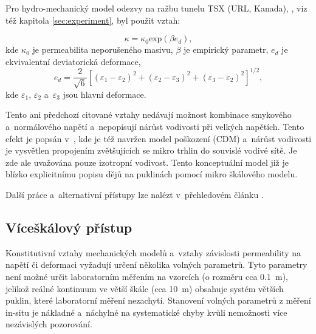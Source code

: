 \documentclass{article}
\begin{document}
Pro hydro-mechanický model odezvy na ražbu tunelu TSX (URL, Kanada), \cite{Rutqvist2009}, viz též kapitola \ref{sec:experiment}, byl použit vztah:

$$
	\kappa = \kappa_0 \mbox{exp}(\beta e_d),
$$
kde $\kappa_0$ je permeabilita neporušeného masivu, $\beta$ je empirický parametr, $e_d$ je ekvivalentní
deviatorická deformace,
$$
	e_d = \frac{2}{\sqrt{6}}[(\varepsilon_1 - \varepsilon_2)^2 + (\varepsilon_2 - \varepsilon_3)^2 + (\varepsilon_3 - \varepsilon_2)^2]^{1/2},
$$
kde $\varepsilon_1$, $\varepsilon_2$ a~$\varepsilon_3$ jsou hlavní deformace.


Tento ani předchozí citované vztahy nedávají možnost kombinace smykového a~normálového napětí a~nepopisují 
nárůst vodivosti při velkých napětích. Tento efekt je popsán v~\cite{Souley2001}, kde je též navržen model poškození (CDM)
a~nárůst vodivosti je vysvětlen propojením zvětšujících se mikro trhlin do souvislé vodivé sítě.
Je zde ale uvažována pouze izotropní vodivost. Tento konceptuální model již je blízko explicitnímu popisu dějů na puklinách 
pomocí mikro škálového modelu.

Další práce a~alternativní přístupy lze nalézt v~přehledovém článku \cite{Shahbazi2020a}. 




\subsection{Víceškálový přístup}
\label{sec:mikroskala}
Konstitutivní vztahy mechanických modelů a~vztahy závislosti permeability na napětí či deformaci vyžadují určení 
několika volných parametrů. Tyto parametry není možné určit laboratorním měřením na vzorcích (o rozměru cca 0.1~m), 
jelikož reálné kontinuum ve větší škále (cca 10~m) obsahuje systém větších puklin, které laboratorní měření nezachytí. 
Stanovení volných parametrů z měření in-situ je nákladné a~náchylné na systematické chyby kvůli nemožnosti 
více nezávislých pozorování. 
\end{document}
